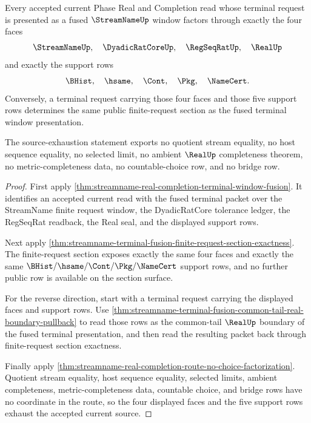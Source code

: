 \begin{theorem}
\label{thm:streamname-terminal-window-fusion-source-exhaustion}
Every accepted current Phase Real and Completion read whose terminal request is
presented as a fused $\StreamNameUp$ window factors through exactly the four
faces
$$
\StreamNameUp,\quad \DyadicRatCoreUp,\quad \RegSeqRatUp,\quad \RealUp
$$
and exactly the support rows
$$
\BHist,\quad \hsame,\quad \Cont,\quad \Pkg,\quad \NameCert.
$$
Conversely, a terminal request carrying those four faces and those five support
rows determines the same public finite-request section as the fused terminal
window presentation.

The source-exhaustion statement exports no quotient stream equality, no host
sequence equality, no selected limit, no ambient $\RealUp$ completeness theorem,
no metric-completeness data, no countable-choice row, and no bridge row.
\end{theorem}
\begin{proof}
First apply \autoref{thm:streamname-real-completion-terminal-window-fusion}. It
identifies an accepted current read with the fused terminal packet over the
StreamName finite request window, the DyadicRatCore tolerance ledger, the
RegSeqRat readback, the Real seal, and the displayed support rows.

Next apply
\autoref{thm:streamname-terminal-fusion-finite-request-section-exactness}. The
finite-request section exposes exactly the same four faces and exactly the same
$\BHist/\hsame/\Cont/\Pkg/\NameCert$ support rows, and no further public row is
available on the section surface.

For the reverse direction, start with a terminal request carrying the displayed
faces and support rows. Use
\autoref{thm:streamname-terminal-fusion-common-tail-real-boundary-pullback} to
read those rows as the common-tail $\RealUp$ boundary of the fused terminal
presentation, and then read the resulting packet back through finite-request
section exactness.

Finally apply
\autoref{thm:streamname-real-completion-route-no-choice-factorization}. Quotient
stream equality, host sequence equality, selected limits, ambient completeness,
metric-completeness data, countable choice, and bridge rows have no coordinate
in the route, so the four displayed faces and the five support rows exhaust the
accepted current source.
\end{proof}

